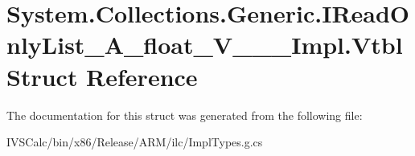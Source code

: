\hypertarget{struct_system_1_1_collections_1_1_generic_1_1_i_read_only_list___a__float___v_______impl_1_1_vtbl}{}\section{System.\+Collections.\+Generic.\+I\+Read\+Only\+List\+\_\+\+A\+\_\+float\+\_\+\+V\+\_\+\+\_\+\+\_\+\+Impl.\+Vtbl Struct Reference}
\label{struct_system_1_1_collections_1_1_generic_1_1_i_read_only_list___a__float___v_______impl_1_1_vtbl}


The documentation for this struct was generated from the following file\+:\begin{DoxyCompactItemize}
\item 
I\+V\+S\+Calc/bin/x86/\+Release/\+A\+R\+M/ilc/Impl\+Types.\+g.\+cs\end{DoxyCompactItemize}
